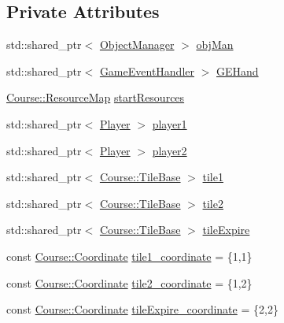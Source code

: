 \subsection*{Private Attributes}
\begin{DoxyCompactItemize}
\item 
std\-::shared\-\_\-ptr$<$ \hyperlink{classGame_1_1ObjectManager}{Object\-Manager} $>$ \hyperlink{classdefault__worker_af5dedfd6c8224ee5ca2eba1290f7a853}{obj\-Man}
\item 
std\-::shared\-\_\-ptr$<$ \hyperlink{classGame_1_1GameEventHandler}{Game\-Event\-Handler} $>$ \hyperlink{classdefault__worker_a44df0b6b6c93b3992dfbc912001c47d1}{G\-E\-Hand}
\item 
\hyperlink{namespaceCourse_ab9a46ed9cd00485e318e5731ea2f78d9}{Course\-::\-Resource\-Map} \hyperlink{classdefault__worker_acd1ecdadb65e25b996f64a42790f83d1}{start\-Resources}
\item 
std\-::shared\-\_\-ptr$<$ \hyperlink{classGame_1_1Player}{Player} $>$ \hyperlink{classdefault__worker_aba0535cd3653d51e44437df2796edb0a}{player1}
\item 
std\-::shared\-\_\-ptr$<$ \hyperlink{classGame_1_1Player}{Player} $>$ \hyperlink{classdefault__worker_a099ddc74e55afb29982086d62063e34c}{player2}
\item 
std\-::shared\-\_\-ptr$<$ \hyperlink{classCourse_1_1TileBase}{Course\-::\-Tile\-Base} $>$ \hyperlink{classdefault__worker_a1dca180451327fc342c5874f31dc5b34}{tile1}
\item 
std\-::shared\-\_\-ptr$<$ \hyperlink{classCourse_1_1TileBase}{Course\-::\-Tile\-Base} $>$ \hyperlink{classdefault__worker_a58ff3b99ca13fb2bac484383cb97224e}{tile2}
\item 
std\-::shared\-\_\-ptr$<$ \hyperlink{classCourse_1_1TileBase}{Course\-::\-Tile\-Base} $>$ \hyperlink{classdefault__worker_ae85c6a01155685fe642e8e6c55116da2}{tile\-Expire}
\item 
const \hyperlink{classCourse_1_1Coordinate}{Course\-::\-Coordinate} \hyperlink{classdefault__worker_a8d151cfc7d0d347577cdb66f3db280b0}{tile1\-\_\-coordinate} = \{1,1\}
\item 
const \hyperlink{classCourse_1_1Coordinate}{Course\-::\-Coordinate} \hyperlink{classdefault__worker_a5bbce973c2c9387484b709d57f718054}{tile2\-\_\-coordinate} = \{1,2\}
\item 
const \hyperlink{classCourse_1_1Coordinate}{Course\-::\-Coordinate} \hyperlink{classdefault__worker_a0a0fe24881186dbb4704e66f121dfeb2}{tile\-Expire\-\_\-coordinate} = \{2,2\}
\item 

\end{DoxyCompactItemize}
